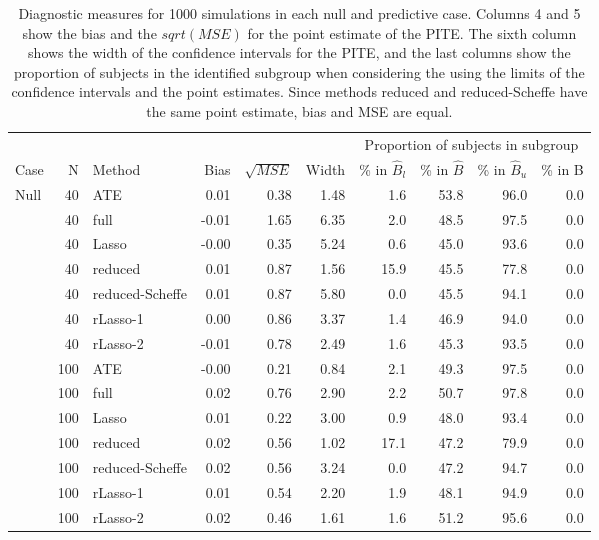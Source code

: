 \begin{table}
\centering
\caption{Diagnostic measures for 1000 simulations in each null and predictive case.
  Columns 4 and 5 show the bias and the $sqrt(MSE)$ for the point estimate of the PITE.
  The sixth column shows the width of the confidence intervals for the PITE, and the last columns
show the proportion of subjects in the identified subgroup when considering the
using the limits of the confidence intervals and the point estimates.
  Since methods reduced and reduced-Scheffe have the same point estimate, bias and MSE are equal.} 
\label{table2}
\begingroup\small
\begin{tabular}{lrlrrrrrrr}
  \hline 
 \multicolumn{6}{c}{} & \multicolumn{4}{c}{Proportion of subjects in subgroup} \\ 
 \cline{7-10} 
  \addrowspace Case & N & Method & Bias & $\sqrt{MSE}$ & Width & \% in $\hat{B}_{l}$ & \% in $\hat{B}$ & \% in $\hat{B}_{u}$ & \% in B \\ 
   \hline\addrowspace Null & 40 & ATE & 0.01 & 0.38 & 1.48 & 1.6 & 53.8 & 96.0 & 0.0 \\ 
   & 40 & full & -0.01 & 1.65 & 6.35 & 2.0 & 48.5 & 97.5 & 0.0 \\ 
   & 40 & Lasso & -0.00 & 0.35 & 5.24 & 0.6 & 45.0 & 93.6 & 0.0 \\ 
   & 40 & reduced & 0.01 & 0.87 & 1.56 & 15.9 & 45.5 & 77.8 & 0.0 \\ 
   & 40 & reduced-Scheffe & 0.01 & 0.87 & 5.80 & 0.0 & 45.5 & 94.1 & 0.0 \\ 
   & 40 & rLasso-1 & 0.00 & 0.86 & 3.37 & 1.4 & 46.9 & 94.0 & 0.0 \\ 
   & 40 & rLasso-2 & -0.01 & 0.78 & 2.49 & 1.6 & 45.3 & 93.5 & 0.0 \\ 
   \addrowspace  & 100 & ATE & -0.00 & 0.21 & 0.84 & 2.1 & 49.3 & 97.5 & 0.0 \\ 
   & 100 & full & 0.02 & 0.76 & 2.90 & 2.2 & 50.7 & 97.8 & 0.0 \\ 
   & 100 & Lasso & 0.01 & 0.22 & 3.00 & 0.9 & 48.0 & 93.4 & 0.0 \\ 
   & 100 & reduced & 0.02 & 0.56 & 1.02 & 17.1 & 47.2 & 79.9 & 0.0 \\ 
   & 100 & reduced-Scheffe & 0.02 & 0.56 & 3.24 & 0.0 & 47.2 & 94.7 & 0.0 \\ 
   & 100 & rLasso-1 & 0.01 & 0.54 & 2.20 & 1.9 & 48.1 & 94.9 & 0.0 \\ 
   & 100 & rLasso-2 & 0.02 & 0.46 & 1.61 & 1.6 & 51.2 & 95.6 & 0.0 \\ 

\end{tabular}
\end{table}

